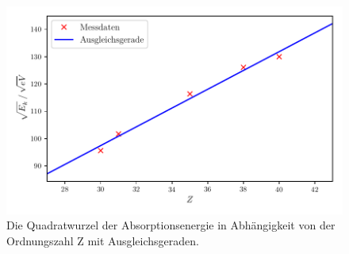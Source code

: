 \begin{figure}
  \centering
  \includegraphics{plot_moseley.pdf}
  \caption{Die Quadratwurzel der Absorptionsenergie in Abhängigkeit von der Ordnungszahl Z mit Ausgleichsgeraden.}
  \label{fig:moseley}
\end{figure}


